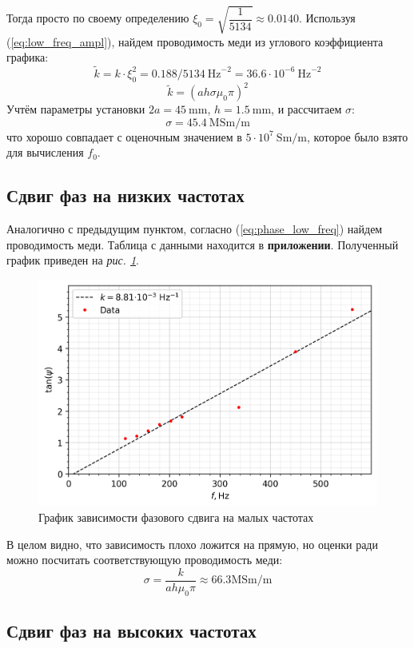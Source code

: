 \documentclass[12pt, a4paper]{article}
\newcommand{\Hz}{~\mathrm{Hz}}
\newcommand{\mm}{~\mathrm{mm}}
\begin{document}
Тогда просто по своему определению $\xi_0 = \sqrt{\dfrac{1}{5134}} \approx 0.0140$.
Используя (\ref{eq:low_freq_ampl}), найдем проводимость меди из углового коэффициента графика:
\[\tilde{k} = k \cdot \xi_0^2 = 0.188/5134 \Hz^{-2}= 36.6\cdot10^{-6} \Hz^{-2}\]
\[\tilde{k} = (ah\sigma \mu_0 \pi)^2\]
Учтём параметры установки $2a = 45 \mm$, $h = 1.5 \mm$, и рассчитаем $\sigma$:
\[\sigma = 45.4~\mathrm{MSm/m}\]
что хорошо совпадает с оценочным значением в $5\cdot 10^7~\mathrm{Sm/m}$, которое было взято для вычисления $f_0$.
\subsection{Сдвиг фаз на низких частотах}
Аналогично с предыдущим пунктом, согласно (\ref{eq:phase_low_freq}) найдем проводимость меди.
Таблица с данными находится в \textbf{приложении}. Полученный график приведен на \textit{рис. \ref{fig:plot_low_freq}}.
\begin{figure}[H]
  \centering
  \includegraphics[width=0.6\linewidth]{pics/res8.png}
  \caption{График зависимости фазового сдвига на малых частотах}
  \label{fig:plot_low_freq}
\end{figure}
В целом видно, что зависимость плохо ложится на прямую, но оценки ради можно посчитать соответствующую проводимость меди:
\[\sigma = \dfrac{k}{ah\mu_0 \pi} \approx 66.3 \mathrm{MSm/m}\]

\subsection{Сдвиг фаз на высоких частотах}
\end{document}
